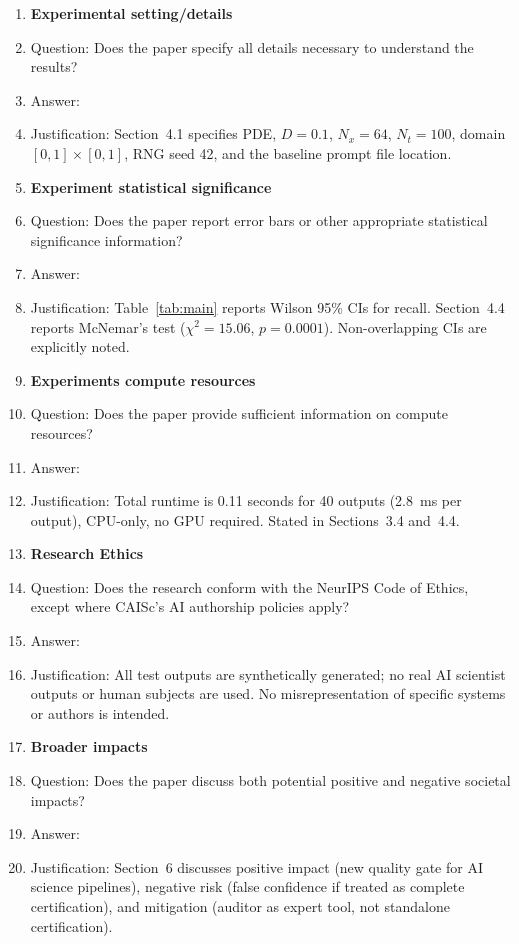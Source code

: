 \documentclass{article}
\begin{document}
\begin{enumerate}
\item \textbf{Experimental setting/details}
  \item[] Question: Does the paper specify all details necessary to understand
    the results?
  \item[] Answer: \answerYes{}
  \item[] Justification: Section~4.1 specifies PDE, $D=0.1$, $N_x=64$,
    $N_t=100$, domain $[0,1]\times[0,1]$, RNG seed 42, and the baseline
    prompt file location.

\item \textbf{Experiment statistical significance}
  \item[] Question: Does the paper report error bars or other appropriate
    statistical significance information?
  \item[] Answer: \answerYes{}
  \item[] Justification: Table~\ref{tab:main} reports Wilson 95\% CIs for
    recall. Section~4.4 reports McNemar's test ($\chi^2=15.06$, $p=0.0001$).
    Non-overlapping CIs are explicitly noted.

\item \textbf{Experiments compute resources}
  \item[] Question: Does the paper provide sufficient information on compute
    resources?
  \item[] Answer: \answerYes{}
  \item[] Justification: Total runtime is 0.11 seconds for 40 outputs
    (2.8~ms per output), CPU-only, no GPU required. Stated in
    Sections~3.4 and~4.4.

\item \textbf{Research Ethics}
  \item[] Question: Does the research conform with the NeurIPS Code of Ethics,
    except where CAISc's AI authorship policies apply?
  \item[] Answer: \answerYes{}
  \item[] Justification: All test outputs are synthetically generated; no
    real AI scientist outputs or human subjects are used. No misrepresentation
    of specific systems or authors is intended.

\item \textbf{Broader impacts}
  \item[] Question: Does the paper discuss both potential positive and negative
    societal impacts?
  \item[] Answer: \answerYes{}
  \item[] Justification: Section~6 discusses positive impact (new quality gate
    for AI science pipelines), negative risk (false confidence if treated as
    complete certification), and mitigation (auditor as expert tool, not
    standalone certification).

\end{enumerate}
\end{document}
